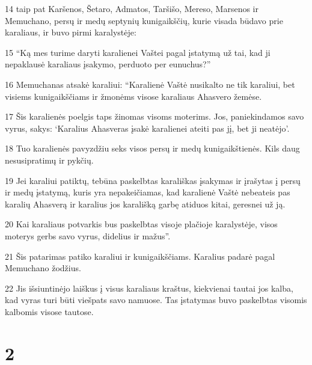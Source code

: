 \par 14 taip pat Karšenos, Šetaro, Admatos, Taršišo, Mereso, Marsenos ir Memuchano, persų ir medų septynių kunigaikščių, kurie visada būdavo prie karaliaus, ir buvo pirmi karalystėje: 
\par 15 “Ką mes turime daryti karalienei Vaštei pagal įstatymą už tai, kad ji nepaklausė karaliaus įsakymo, perduoto per eunuchus?” 
\par 16 Memuchanas atsakė karaliui: “Karalienė Vaštė nusikalto ne tik karaliui, bet visiems kunigaikščiams ir žmonėms visose karaliaus Ahasvero žemėse. 
\par 17 Šis karalienės poelgis taps žinomas visoms moterims. Jos, paniekindamos savo vyrus, sakys: ‘Karalius Ahasveras įsakė karalienei ateiti pas jį, bet ji neatėjo’. 
\par 18 Tuo karalienės pavyzdžiu seks visos persų ir medų kunigaikštienės. Kils daug nesusipratimų ir pykčių. 
\par 19 Jei karaliui patiktų, tebūna paskelbtas karališkas įsakymas ir įrašytas į persų ir medų įstatymą, kuris yra nepakeičiamas, kad karalienė Vaštė nebeateis pas karalių Ahasverą ir karalius jos karališką garbę atiduos kitai, geresnei už ją. 
\par 20 Kai karaliaus potvarkis bus paskelbtas visoje plačioje karalystėje, visos moterys gerbs savo vyrus, didelius ir mažus”. 
\par 21 Šis patarimas patiko karaliui ir kunigaikščiams. Karalius padarė pagal Memuchano žodžius. 
\par 22 Jis išsiuntinėjo laiškus į visus karaliaus kraštus, kiekvienai tautai jos kalba, kad vyras turi būti viešpats savo namuose. Tas įstatymas buvo paskelbtas visomis kalbomis visose tautose.


\chapter{2}

